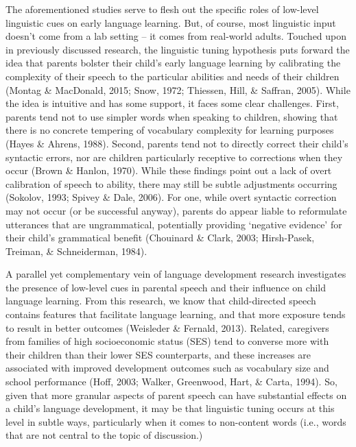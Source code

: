 \documentclass[10pt, letterpaper]{article}
\begin{document}
The aforementioned studies serve to flesh out the specific roles of
low-level linguistic cues on early language learning. But, of course,
most linguistic input doesn't come from a lab setting -- it comes from
real-world adults. Touched upon in previously discussed research, the
linguistic tuning hypothesis puts forward the idea that parents bolster
their child's early language learning by calibrating the complexity of
their speech to the particular abilities and needs of their children
(Montag \& MacDonald, 2015; Snow, 1972; Thiessen, Hill, \& Saffran,
2005). While the idea is intuitive and has some support, it faces some
clear challenges. First, parents tend not to use simpler words when
speaking to children, showing that there is no concrete tempering of
vocabulary complexity for learning purposes (Hayes \& Ahrens, 1988).
Second, parents tend not to directly correct their child's syntactic
errors, nor are children particularly receptive to corrections when they
occur (Brown \& Hanlon, 1970). While these findings point out a lack of
overt calibration of speech to ability, there may still be subtle
adjustments occurring (Sokolov, 1993; Spivey \& Dale, 2006). For one,
while overt syntactic correction may not occur (or be successful
anyway), parents do appear liable to reformulate utterances that are
ungrammatical, potentially providing `negative evidence' for their
child's grammatical benefit (Chouinard \& Clark, 2003; Hirsh-Pasek,
Treiman, \& Schneiderman, 1984).

A parallel yet complementary vein of language development research
investigates the presence of low-level cues in parental speech and their
influence on child language learning. From this research, we know that
child-directed speech contains features that facilitate language
learning, and that more exposure tends to result in better outcomes
(Weisleder \& Fernald, 2013). Related, caregivers from families of high
socioeconomic status (SES) tend to converse more with their children
than their lower SES counterparts, and these increases are associated
with improved development outcomes such as vocabulary size and school
performance (Hoff, 2003; Walker, Greenwood, Hart, \& Carta, 1994). So,
given that more granular aspects of parent speech can have substantial
effects on a child's language development, it may be that linguistic
tuning occurs at this level in subtle ways, particularly when it comes
to non-content words (i.e., words that are not central to the topic of
discussion.)
\end{document}
